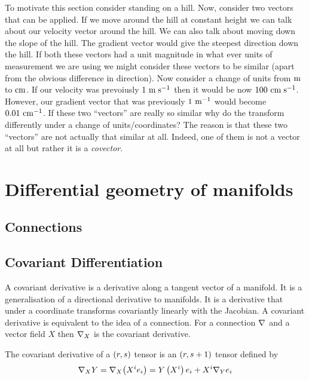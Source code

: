 To motivate this section consider standing on a hill. Now, consider two
vectors that can be applied. If we move around the hill at constant height we
can talk about our velocity vector around the hill. We can also talk about
moving down the slope of the hill. The gradient vector would give the steepest
direction down the hill. If both these vectors had a unit magnitude in what
ever units of measurement we are using we might consider these vectors to be
similar (apart from the obvious difference in direction). Now consider a
change of units \eg from $\mathrm{m}$ to $\mathrm{cm}$. If our velocity was prevoiusly
$ 1~\mathrm{\mathrm{m}\thickspace\mathrm{s}^{-1}} $ then it would be now $ 100~\mathrm{\mathrm{cm}\thickspace\mathrm{s}^{-1}} $. However, our
gradient vector that was previously $ 1~\mathrm{\mathrm{m}^{-1}} $ would become
$ 0.01~\mathrm{\mathrm{cm}^{-1}} $. If these two ``vectors'' are really so similar why do
the transform differently under a change of units/coordinates? The reason is
that these two ``vectors'' are not actually that similar at all. Indeed, one
of them is not a vector at all but rather it is a \emph{covector}.

\section{Differential geometry of manifolds}

\subsection{Connections}


\subsection{Covariant Differentiation}

A covariant derivative is a derivative along a tangent vector of a
manifold. It is a generalisation of a directional derivative to manifolds. It
is a derivative that under a coordinate transforms covariantly \ie linearly
with the Jacobian. A covariant derivative is equivalent to the idea of a
connection. For a connection $ \nabla_{}{} $ and a vector field $X$ then
$\covarderivop{X}{}$ is the covariant derivative. 

The covariant derivative of a $\left( r,s \right)$ tensor is an $\left( r,s+1 \right)$
tensor defined by
\begin{equation}
  \covarderivop{X}{Y}=\covarderivop{X}{\pbrac{X^{i}e_{i}}}=Y\pbrac{X^{i}}e_{i}+X^{i}\covarderivop{Y}{e_{i}}
\end{equation}


